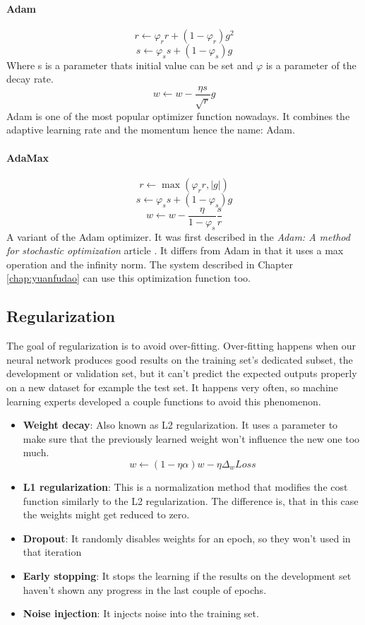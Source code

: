 \paragraph*{Adam}
\[r \leftarrow \varphi_r r + (1 - \varphi_r) g^2\]
\[s \leftarrow \varphi_s s + (1 - \varphi_s) g\]
Where s is a parameter thats initial value can be set and \(\varphi\) is a parameter of the decay rate.
\[w \leftarrow w - \frac{\eta s}{\sqrt{r}} g\]
Adam is one of the most popular optimizer function nowadays. It combines the adaptive learning rate and the momentum hence the name: Adam.

\paragraph*{AdaMax}
\[r \leftarrow \max(\varphi_r r, |g|)\]
\[s \leftarrow \varphi_s s + (1 - \varphi_s) g\]
\[w \leftarrow w - \frac{\eta}{1 - \varphi_s}\frac{s}{r}\]
A variant of the Adam optimizer. It was first described in the \textit{Adam: A method for stochastic optimization} article \cite{Kingma:2015}. It differs from Adam in that it uses a max operation and the infinity norm. The system described in Chapter \ref{chap:yuanfudao} can use this optimization function too.

\subsection{Regularization}
The goal of regularization is to avoid over-fitting. Over-fitting happens when our neural network produces good results on the training set's dedicated subset, the development or validation set, but it can't predict the expected outputs properly on a new dataset for example the test set. It happens very often, so machine learning experts developed a couple functions to avoid this phenomenon.
\begin{itemize}
	\item \textbf{Weight decay}: Also known as L2 regularization. It uses a parameter to make sure that the previously learned weight won't influence the new one too much. \[w \leftarrow (1 - \eta \alpha)w - \eta \Delta_w Loss\]
	\item \textbf{L1 regularization}: This is a normalization method that modifies the cost function similarly to the L2 regularization. The difference is, that in this case the weights might get reduced to zero.
	\item \textbf{Dropout}: It randomly disables weights for an epoch, so they won't used in that iteration
	\item \textbf{Early stopping}: It stops the learning if the results on the development set haven't shown any progress in the last couple of epochs.
	\item \textbf{Noise injection}: It injects noise into the training set.
\end{itemize}

